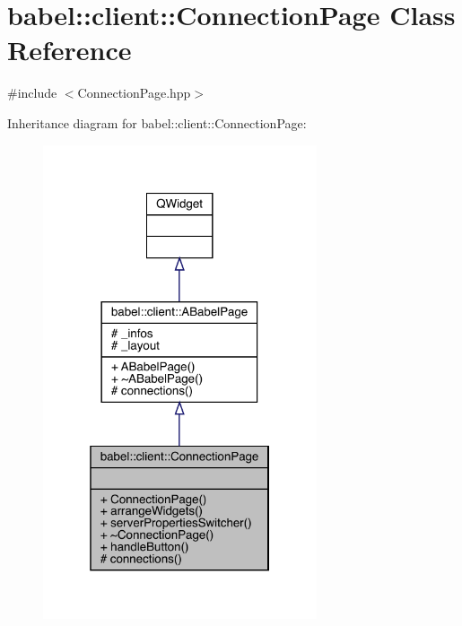 \hypertarget{classbabel_1_1client_1_1_connection_page}{}\section{babel\+:\+:client\+:\+:Connection\+Page Class Reference}
\label{classbabel_1_1client_1_1_connection_page}


{\ttfamily \#include $<$Connection\+Page.\+hpp$>$}



Inheritance diagram for babel\+:\+:client\+:\+:Connection\+Page\+:\nopagebreak
\begin{figure}[H]
\begin{center}
\leavevmode
\includegraphics[width=229pt]{classbabel_1_1client_1_1_connection_page__inherit__graph}
\end{center}
\end{figure}


